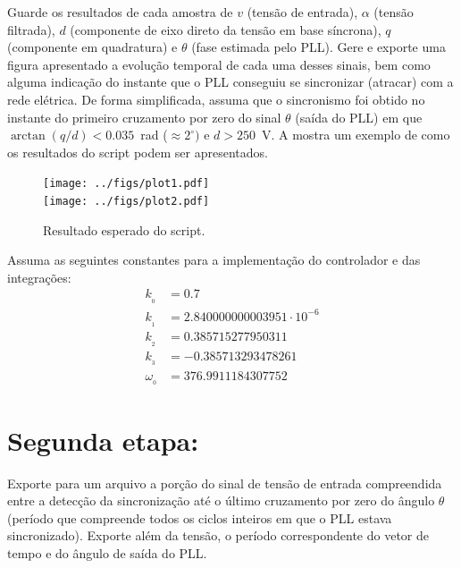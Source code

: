 Guarde os resultados de cada amostra de $v$ (tensão de entrada), $\alpha$ (tensão filtrada), $d$ (componente de eixo
direto da tensão em base síncrona), $q$ (componente em quadratura) e $\theta$ (fase estimada pelo PLL).
Gere e exporte uma figura apresentado a evolução temporal de cada uma desses sinais, bem como alguma indicação do
instante que o PLL conseguiu se sincronizar (atracar) com a rede elétrica.
De forma simplificada, assuma que o sincronismo foi obtido no instante do primeiro cruzamento por zero do sinal
$\theta$ (saída do PLL) em que
$\arctan(q/d) < 0.035$~rad ($\approx 2^\circ)$ e $d > 250$~V.
A  mostra um exemplo de como os resultados do script podem ser
apresentados.
\begin{figure}[htbp]
    \centering
    \texttt{[image: ../figs/plot1.pdf]}\\
    \vspace{-16pt}
    \texttt{[image: ../figs/plot2.pdf]}
    \caption{Resultado esperado do script.}
    \label{fig:plot}
\end{figure}

Assuma as seguintes constantes para a implementação do controlador e das integrações:
\begin{equation}\label{eq:cont}
    \begin{aligned}
        k_{_0} &= 0.7 \\
        k_{_1} &= 2.840000000003951\cdot 10^{-6} \\
        k_{_2} &= 0.385715277950311 \\
        k_{_3} &= -0.385713293478261 \\
        \omega_{_0} &= 376.9911184307752
    \end{aligned}
\end{equation}


\section*{Segunda etapa:}
Exporte para um arquivo  a porção do sinal de tensão de entrada compreendida entre a detecção
da sincronização até o último cruzamento por zero do ângulo $\theta$ (período que compreende todos os ciclos inteiros
em que o PLL estava sincronizado).
Exporte além da tensão, o período correspondente do vetor de tempo e do ângulo de saída do PLL.

